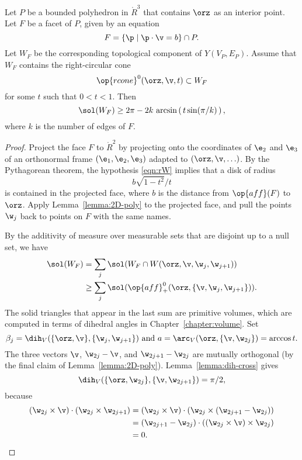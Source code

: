 \begin{lemma}[]\label{lemma:ngon} 
  Let $P$ be a bounded polyhedron in $\ring{R}^3$ that contains $\orz$
  as an interior point.  Let $F$ be a facet of $P$, given by an
  equation
\[  
F = \{\p \mid \p \cdot \v = b\} \cap P.
\]  
Let $W_F$ be the corresponding topological component of $Y(V_P,E_P)$.
Assume that $W_F$ contains the right-circular cone
\begin{equation}\label{eqn:rW}
\op{rcone}^0(\orz,\v,t) \subset W_F
\end{equation}
for some $t$ such that $0<t<1$.
Then 
\[  
\sol(W_F) \ge 
2\pi - 2 k \,\arcsin\left(\,t\sin(\pi/k)\,\right),
\] 
where $k$ is the number of edges of $F$.
\end{lemma}

\begin{proof}
  Project the face $F$ to $\ring{R}^2$ by  projecting onto
  the coordinates of $\e_2$ and $\e_3$ of  an orthonormal frame
  $(\e_1,\e_2,\e_3)$ adapted to $(\orz,\v,\ldots)$.  By the Pythagorean theorem,
  the hypothesis \eqref{eqn:rW} implies that a disk of radius
\[
b \sqrt{1-t^2}/t
\]
is contained in the projected face, where $b$ is the distance from
$\op{aff}(F)$ to $\orz$.  Apply Lemma~\ref{lemma:2D-poly} to the
projected face, and pull the points $\w_j$ back to points on $F$ with the same names.

By the additivity of measure over measurable sets that are disjoint up
to a null set, we have
\begin{align*}
\sol(W_F) &= \sum_j \sol(W_F \cap W(\orz,\v,\w_j,\w_{j+1}))\\
  &\ge \sum_j \sol(\op{aff}_+^0(\orz,\{\v,\w_j,\w_{j+1}\})).
\end{align*}
The solid triangles that appear in the last sum are primitive volumes,
which are computed in terms of
dihedral angles  in Chapter~\ref{chapter:volume}.  Set
\[
\beta_j=\dih_V(\{\orz,\v\},\{\w_j,\w_{j+1}\}) \text{ and }
a = \arc_V(\orz,\{\v,\w_{2j}\}) = \arccos t.
\]
The three vectors $\v$, $\w_{2j}-\v$, and $\w_{2j+1}-\w_{2j}$ are
mutually orthogonal (by the final claim of Lemma~\ref{lemma:2D-poly}).
Lemma~\ref{lemma:dih-cross} gives
\[
\dih_V(\{\orz,\w_{2j}\},\{\v,\w_{2j+1}\}) =\pi/2,
\]
because
\begin{align*}
(\w_{2j} \times \v)\cdot (\w_{2j}\times \w_{2j+1}) &=
(\w_{2j} \times \v)\cdot (\w_{2j}\times (\w_{2j+1}-\w_{2j}))\\
 &=  (\w_{2j+1}-\w_{2j})\cdot ((\w_{2j} \times \v)\times \w_{2j})\\
&= 0.
\end{align*}


\end{proof}
